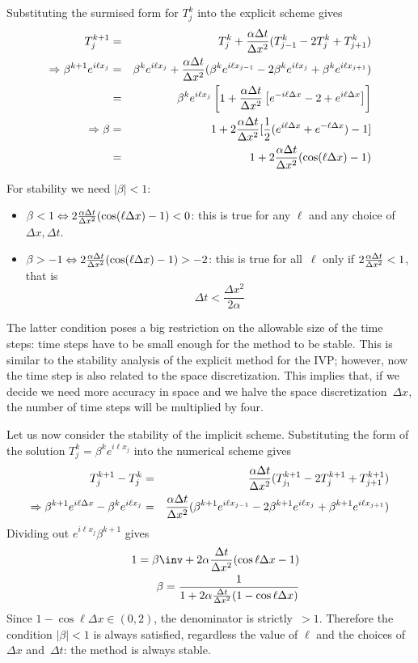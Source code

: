 Substituting the surmised form for $T_j^k$ into the  explicit scheme gives
  \begin{eqnarray*}
    T_j^{k+1}&=&T_j^k+\frac{\alpha\Delta t}{\Delta x^2}(T_{j-1}^k-2T_j^k+T_{j+1}^k)\\
    \Rightarrow \beta^{k+1}e^{i\ell x_j}&=&\beta^ke^{i\ell x_j}
    +\frac{\alpha\Delta t}{\Delta x^2} (\beta^ke^{i\ell x_{j-1}}-2\beta^ke^{i\ell x_j}+\beta^ke^{i\ell x_{j+1}})\\
    &=&\beta^ke^{i\ell x_j}\left[1+\frac{\alpha\Delta t}{\Delta x^2}\left[e^{-i\ell\Delta x}-2+e^{i\ell\Delta x}\right]\right]\\
    \Rightarrow \beta&=&
    1+2\frac{\alpha\Delta t}{\Delta x^2}[\frac12(e^{i\ell\Delta x}+e^{-\ell\Delta x})-1]\\
    &=&1+2\frac{\alpha\Delta t}{\Delta x^2}(\cos(\ell\Delta x)-1)
  \end{eqnarray*}

For stability we need $|\beta|<1$:
  \begin{itemize}
  \item $\beta<1\Leftrightarrow 2\frac{\alpha\Delta t}{\Delta x^2}(\cos(\ell\Delta x)-1)<0$: this is
    true for any $\ell$ and any choice of $\Delta x,\Delta t$.
  \item $\beta>-1\Leftrightarrow 2\frac{\alpha\Delta t}{\Delta x^2}(\cos(\ell\Delta x)-1)>-2$: this
    is true for all~$\ell$ only if $2\frac{\alpha\Delta t}{\Delta x^2}<1$, that is
    \begin{equation}
      \Delta t<\frac{\Delta x^2}{2\alpha}
    \end{equation}
  \end{itemize}
The latter condition poses a big restriction on the allowable size of
the time steps: time steps have to be small enough for the method to
be stable. This is similar to the stability analysis of the explicit
method for the \ac{IVP}; however, now the time step is also related to
the space discretization. This implies that, if we decide we need more
accuracy in space and we halve the space discretization~$\Delta x$,
the number of time steps will be multiplied by four.

Let us now consider the stability of the implicit scheme.
Substituting the form of the solution $T_j^k=\beta^ke^{i\ell x_j}$
into the numerical scheme gives
  \begin{eqnarray*}
    T_j^{k+1}-T_j^k&=&\frac{\alpha\Delta t}{\Delta x^2}(T_{j_1}^{k+1}-2T_j^{k+1}+T_{j+1}^{k+1})\\
    \Rightarrow \beta^{k+1}e^{i\ell \Delta x}-\beta^ke^{i\ell x_j}&=&
    \frac{\alpha\Delta t}{\Delta x^2}(\beta^{k+1}e^{i\ell x_{j-1}}-2\beta^{k+1}e^{i\ell x_j}
    +\beta^{k+1}e^{i\ell x_{j+1}})
  \end{eqnarray*}
Dividing out $e^{i\ell x_j}\beta^{k+1}$ gives
  \begin{eqnarray*}
    &&1=\beta\inv+2\alpha\frac{\Delta t}{\Delta x^2}(\cos\ell\Delta
    x-1)\\
    &&\beta=\frac1{1+2\alpha\frac{\Delta t}{\Delta x^2}(1-\cos\ell\Delta x)}
  \end{eqnarray*}
Since $1-\cos\ell\Delta x\in(0,2)$, the denominator is strictly~$>1$.
Therefore the condition $|\beta|<1$ is always satisfied, regardless
the value of $\ell$ and the choices
of $\Delta x$ and~$\Delta t$: the method is always stable.

